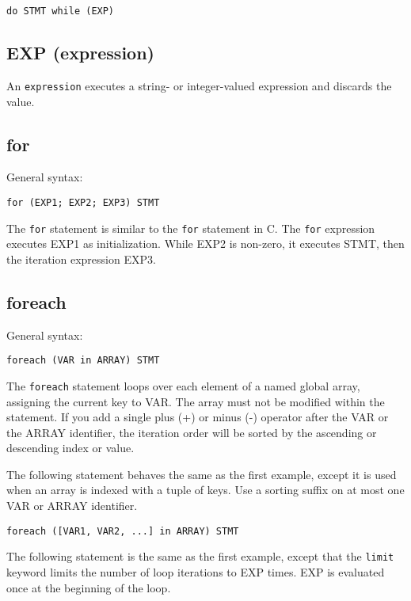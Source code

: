 \documentclass[twoside,english]{article}
\newenvironment{vindent}
{\begin{list}{}{\setlength{\listparindent}{6pt}}
\item[]}
{\end{list}}
\begin{document}
\begin{vindent}
\begin{verbatim}
do STMT while (EXP)
\end{verbatim}
\end{vindent}

\subsection{EXP (expression)}
An \texttt{expression} executes a string- or integer-valued expression and
discards the value.


\subsection{for}
General syntax:
\begin{vindent}
\begin{verbatim}
for (EXP1; EXP2; EXP3) STMT
\end{verbatim}
\end{vindent}
The \texttt{for} statement is similar to the \texttt{for} statement in C.
The \texttt{for} expression executes EXP1 as initialization. While EXP2 is
non-zero, it executes STMT, then the iteration expression EXP3.

\subsection{foreach\label{sub:foreach}}
General syntax:
\begin{vindent}
\begin{verbatim}
foreach (VAR in ARRAY) STMT
\end{verbatim}
\end{vindent}
The \texttt{foreach} statement loops over each element of a named global array, assigning
the current key to VAR. The array must not be modified within the statement.
If you add a single plus (+) or minus (-) operator after the VAR or the ARRAY
identifier, the iteration order will be sorted by the ascending or descending
index or value. 

The following statement behaves the same as the first example, except it
is used when an array is indexed with a tuple of keys.  Use a sorting suffix
on at most one VAR or ARRAY identifier.

\begin{vindent}
\begin{verbatim}
foreach ([VAR1, VAR2, ...] in ARRAY) STMT
\end{verbatim}
\end{vindent}
The following statement is the same as the first example, except that the
\texttt{limit} keyword limits the number of loop iterations to EXP times.
EXP is evaluated once at the beginning of the loop.
\end{document}
